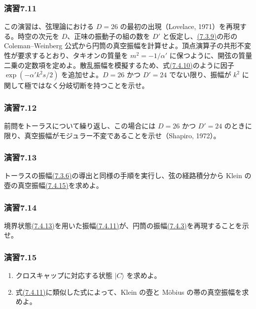 \subsubsection*{演習7.11}\label{ex:7.11}
この演習は、弦理論における $D=26$ の最初の出現（Lovelace, 1971）を再現する。時空の次元を $D$、正味の振動子の組の数を $D'$ と仮定し、\hyperref[eq:7.3.9]{(7.3.9)}の形の Coleman--Weinberg 公式から円筒の真空振幅を計算せよ。頂点演算子の共形不変性が要求するとおり、タキオンの質量を $m^2=-1/\alpha'$ に保つように、開弦の質量二乗の定数項を定めよ。散乱振幅を模擬するため、式\hyperref[eq:7.4.10]{(7.4.10)}のように因子 $\exp(-\alpha'k^2s/2)$ を追加せよ。$D=26$ かつ $D'=24$ でない限り、振幅が $k^2$ に関して極ではなく分岐切断を持つことを示せ。

\subsubsection*{演習7.12}\label{ex:7.12}
前問をトーラスについて繰り返し、この場合には $D=26$ かつ $D'=24$ のときに限り、真空振幅がモジュラー不変であることを示せ（Shapiro, 1972）。

\subsubsection*{演習7.13}\label{ex:7.13}
トーラスの振幅\hyperref[eq:7.3.6]{(7.3.6)}の導出と同様の手順を実行し、弦の経路積分から Klein の壺の真空振幅\hyperref[eq:7.4.15]{(7.4.15)}を求めよ。

\subsubsection*{演習7.14}\label{ex:7.14}
境界状態\hyperref[eq:7.4.13]{(7.4.13)}を用いた振幅\hyperref[eq:7.4.11]{(7.4.11)}が、円筒の振幅\hyperref[eq:7.4.3]{(7.4.3)}を再現することを示せ。

\subsubsection*{演習7.15}\label{ex:7.15}
\begin{enumerate}
\item[(a)] クロスキャップに対応する状態 $\lvert C\rangle$ を求めよ。
\item[(b)] 式\hyperref[eq:7.4.11]{(7.4.11)}に類似した式によって、Klein の壺と Möbius の帯の真空振幅を求めよ。
\end{enumerate}

